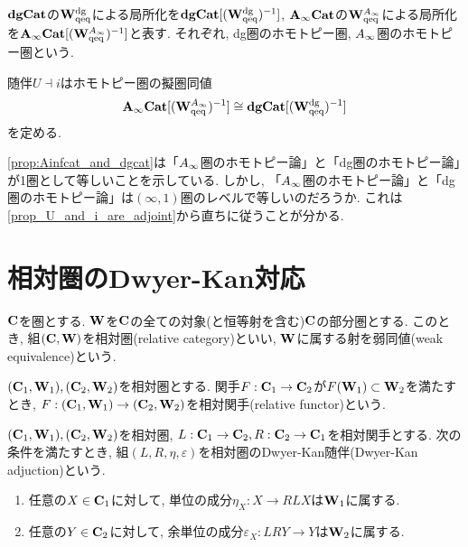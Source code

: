 \documentclass[uplatex, a4paper, 14Q, dvipdfmx]{jsarticle}
\begin{document}
\begin{notation}
  $\mathbf{dgCat}$の$\mathbf{W}^{\mathrm{dg}}_\mathrm{qeq}$による局所化を$\mathbf{dgCat}[(\mathbf{W}^{\mathrm{dg}}_\mathrm{qeq})^{-1}]$, $\mathbf{A}_\infty\mathbf{Cat}$の$\mathbf{W}^{A_{\infty}}_\mathrm{qeq}$による局所化を$\mathbf{A}_\infty\mathbf{Cat}[(\mathbf{W}^{A_{\infty}}_\mathrm{qeq})^{-1}]$と表す. 
  それぞれ, dg圏のホモトピー圏, $A_{\infty}$圏のホモトピー圏という.
\end{notation}

\begin{theorem} \label{prop:Ainfcat_and_dgcat}
  随伴$U \dashv i$はホモトピー圏の擬圏同値
  \begin{align*}
    \mathbf{A}_\infty\mathbf{Cat}[(\mathbf{W}^{A_{\infty}}_\mathrm{qeq})^{-1}] \cong \mathbf{dgCat}[(\mathbf{W}^{\mathrm{dg}}_\mathrm{qeq})^{-1}]
  \end{align*}
  を定める. 
\end{theorem}

\cref{prop:Ainfcat_and_dgcat}は「$A_{\infty}$圏のホモトピー論」と「dg圏のホモトピー論」が1圏として等しいことを示している.
しかし, 「$A_{\infty}$圏のホモトピー論」と「dg圏のホモトピー論」は$(\infty,1)$圏のレベルで等しいのだろうか. 
これは\cref{prop_U_and_i_are_adjoint}から直ちに従うことが分かる. 

\section{相対圏のDwyer-Kan対応}

\begin{definition}[相対圏]
  $\mathbf{C}$を圏とする.
  $\mathbf{W}$を$\mathbf{C}$の全ての対象(と恒等射を含む)$\mathbf{C}$の部分圏とする. 
  このとき, 組$(\mathbf{C},\mathbf{W})$を相対圏(relative category)といい, $\mathbf{W}$に属する射を弱同値(weak equivalence)という.
\end{definition}

\begin{definition}[相対関手]
  $(\mathbf{C}_1,\mathbf{W}_1), (\mathbf{C}_2,\mathbf{W}_2)$を相対圏とする. 
  関手$F : \mathbf{C}_1 \to \mathbf{C}_2$が$F(\mathbf{W}_1) \subset \mathbf{W}_2$を満たすとき, $F : (\mathbf{C}_1,\mathbf{W}_1) \to (\mathbf{C}_2,\mathbf{W}_2)$を相対関手(relative functor)という. 
\end{definition}

\begin{definition}
  $(\mathbf{C}_1,\mathbf{W}_1), (\mathbf{C}_2,\mathbf{W}_2)$を相対圏, $L : \mathbf{C}_1 \to \mathbf{C}_2, R : \mathbf{C}_2 \to \mathbf{C}_1$を相対関手とする.
  次の条件を満たすとき, 組$(L,R,\eta,\varepsilon)$を相対圏のDwyer-Kan随伴(Dwyer-Kan adjuction)という.
  \begin{enumerate}
    \item 任意の$X \in \mathbf{C}_1$に対して, 単位の成分$\eta_X : X \to RLX$は$\mathbf{W}_1$に属する.
    \item 任意の$Y \in \mathbf{C}_2$に対して, 余単位の成分$\varepsilon_X : LRY \to Y$は$\mathbf{W}_2$に属する. 
  \end{enumerate}
\end{definition}
\end{document}

